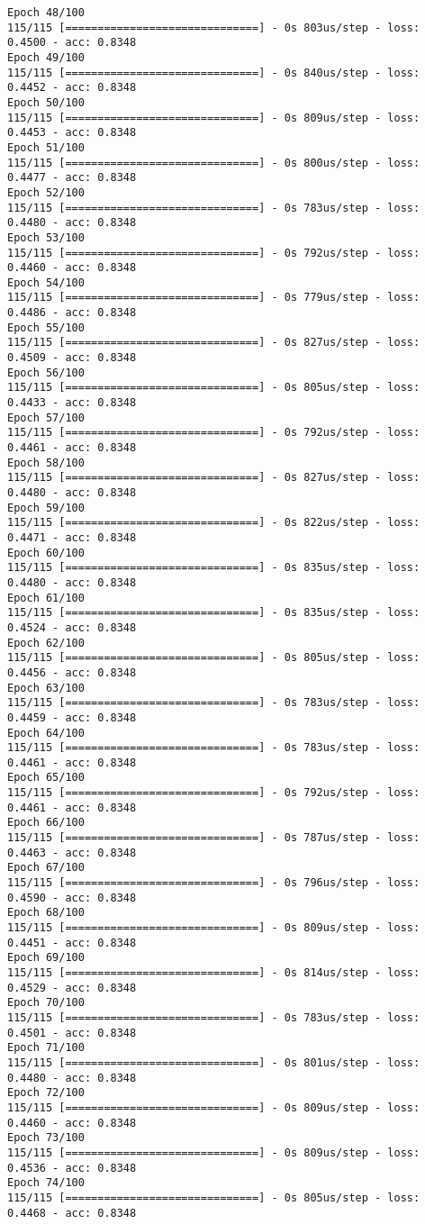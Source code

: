 \documentclass[11pt]{article}
\begin{document}
\begin{Verbatim}[commandchars=\\\{\}]
Epoch 48/100
115/115 [==============================] - 0s 803us/step - loss: 0.4500 - acc: 0.8348
Epoch 49/100
115/115 [==============================] - 0s 840us/step - loss: 0.4452 - acc: 0.8348
Epoch 50/100
115/115 [==============================] - 0s 809us/step - loss: 0.4453 - acc: 0.8348
Epoch 51/100
115/115 [==============================] - 0s 800us/step - loss: 0.4477 - acc: 0.8348
Epoch 52/100
115/115 [==============================] - 0s 783us/step - loss: 0.4480 - acc: 0.8348
Epoch 53/100
115/115 [==============================] - 0s 792us/step - loss: 0.4460 - acc: 0.8348
Epoch 54/100
115/115 [==============================] - 0s 779us/step - loss: 0.4486 - acc: 0.8348
Epoch 55/100
115/115 [==============================] - 0s 827us/step - loss: 0.4509 - acc: 0.8348
Epoch 56/100
115/115 [==============================] - 0s 805us/step - loss: 0.4433 - acc: 0.8348
Epoch 57/100
115/115 [==============================] - 0s 792us/step - loss: 0.4461 - acc: 0.8348
Epoch 58/100
115/115 [==============================] - 0s 827us/step - loss: 0.4480 - acc: 0.8348
Epoch 59/100
115/115 [==============================] - 0s 822us/step - loss: 0.4471 - acc: 0.8348
Epoch 60/100
115/115 [==============================] - 0s 835us/step - loss: 0.4480 - acc: 0.8348
Epoch 61/100
115/115 [==============================] - 0s 835us/step - loss: 0.4524 - acc: 0.8348
Epoch 62/100
115/115 [==============================] - 0s 805us/step - loss: 0.4456 - acc: 0.8348
Epoch 63/100
115/115 [==============================] - 0s 783us/step - loss: 0.4459 - acc: 0.8348
Epoch 64/100
115/115 [==============================] - 0s 783us/step - loss: 0.4461 - acc: 0.8348
Epoch 65/100
115/115 [==============================] - 0s 792us/step - loss: 0.4461 - acc: 0.8348
Epoch 66/100
115/115 [==============================] - 0s 787us/step - loss: 0.4463 - acc: 0.8348
Epoch 67/100
115/115 [==============================] - 0s 796us/step - loss: 0.4590 - acc: 0.8348
Epoch 68/100
115/115 [==============================] - 0s 809us/step - loss: 0.4451 - acc: 0.8348
Epoch 69/100
115/115 [==============================] - 0s 814us/step - loss: 0.4529 - acc: 0.8348
Epoch 70/100
115/115 [==============================] - 0s 783us/step - loss: 0.4501 - acc: 0.8348
Epoch 71/100
115/115 [==============================] - 0s 801us/step - loss: 0.4480 - acc: 0.8348
Epoch 72/100
115/115 [==============================] - 0s 809us/step - loss: 0.4460 - acc: 0.8348
Epoch 73/100
115/115 [==============================] - 0s 809us/step - loss: 0.4536 - acc: 0.8348
Epoch 74/100
115/115 [==============================] - 0s 805us/step - loss: 0.4468 - acc: 0.8348

\end{Verbatim}
\end{document}
